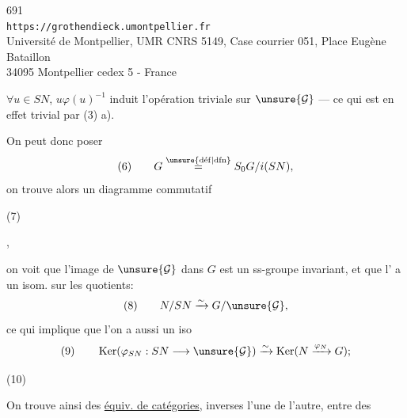 
\begin{center}
691\\
\texttt{https://grothendieck.umontpellier.fr}\\
Université de Montpellier, UMR CNRS 5149, Case courrier 051, Place Eugène Bataillon\\
34095 Montpellier cedex 5 - France
\end{center}



$\forall u\in SN$, $u\varphi(u)^{-1}$ induit l'opération triviale sur $\unsure{\mathcal G}$ --- ce qui est en effet trivial par (3) a).

On peut donc poser
\[
(6)\qquad  G\overset{\unsure{\mathrm{d\acute ef}|\mathrm{dfn}}}{=}S_0G/i(SN),
\]
on trouve alors un diagramme commutatif

\begin{samepage}
\noindent (7)\quad
{}
\end{samepage},

on voit que l'image de $\unsure{\mathcal G}$ dans $G$ est un ss-groupe invariant, et que l' a un isom. sur les quotients:
\[
(8)\qquad  N/SN\xrightarrow{\sim}G/\unsure{\mathcal G},
\]
ce qui implique que l'on a aussi un iso
\[
(9)\qquad  \operatorname{Ker}(\varphi_{SN}:SN\longrightarrow\unsure{\mathcal G})
\xrightarrow{\sim}\operatorname{Ker}(N\xrightarrow{\varphi_N}G);
\]

\begin{samepage}
\noindent (10)\quad
{}
\end{samepage}

On trouve ainsi des \uline{équiv. de catégories}, inverses l'une de l'autre, entre  des

